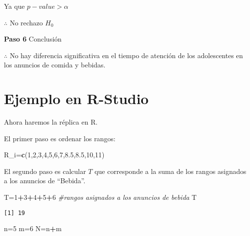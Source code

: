 \documentclass[
  a4paper,
  oneside,
  openany]{book}
\newenvironment{Shaded}{\begin{snugshade}}{\end{snugshade}}
\newcommand{\CommentTok}[1]{\textcolor[rgb]{0.56,0.35,0.01}{\textit{#1}}}
\newcommand{\DecValTok}[1]{\textcolor[rgb]{0.00,0.00,0.81}{#1}}
\newcommand{\FloatTok}[1]{\textcolor[rgb]{0.00,0.00,0.81}{#1}}
\newcommand{\KeywordTok}[1]{\textcolor[rgb]{0.13,0.29,0.53}{\textbf{#1}}}
\newcommand{\NormalTok}[1]{#1}
\newcommand{\OperatorTok}[1]{\textcolor[rgb]{0.81,0.36,0.00}{\textbf{#1}}}
\begin{document}
Ya que \(p-value > \alpha\)

\(\therefore\) No rechazo \(H_0\)

\textbf{Paso 6} Conclusión

\(\therefore\) No hay diferencia significativa en el tiempo de atención de los adolescentes en los anuncios de comida y bebidas.

\hypertarget{ejemplo-en-r-studio-5}{%
\section{Ejemplo en R-Studio}\label{ejemplo-en-r-studio-5}}

Ahora haremos la réplica en R.

El primer paso es ordenar los rangos:

\begin{Shaded}
\begin{Highlighting}[]
\NormalTok{R\_i=}\KeywordTok{c}\NormalTok{(}\DecValTok{1}\NormalTok{,}\DecValTok{2}\NormalTok{,}\DecValTok{3}\NormalTok{,}\DecValTok{4}\NormalTok{,}\DecValTok{5}\NormalTok{,}\DecValTok{6}\NormalTok{,}\DecValTok{7}\NormalTok{,}\FloatTok{8.5}\NormalTok{,}\FloatTok{8.5}\NormalTok{,}\DecValTok{10}\NormalTok{,}\DecValTok{11}\NormalTok{)}
\end{Highlighting}
\end{Shaded}

El segundo paso es calcular \(T\) que corresponde a la suma de los rangos asignados a los anuncios de ``Bebida''.

\begin{Shaded}
\begin{Highlighting}[]
\NormalTok{T=}\DecValTok{1}\OperatorTok{+}\DecValTok{3}\OperatorTok{+}\DecValTok{4}\OperatorTok{+}\DecValTok{5}\OperatorTok{+}\DecValTok{6}  \CommentTok{\#rangos asignados a los anuncios de bebida}
\NormalTok{T}
\end{Highlighting}
\end{Shaded}

\begin{verbatim}
[1] 19
\end{verbatim}

\begin{Shaded}
\begin{Highlighting}[]
\NormalTok{n=}\DecValTok{5}
\NormalTok{m=}\DecValTok{6}
\NormalTok{N=n}\OperatorTok{+}\NormalTok{m}
\end{Highlighting}
\end{Shaded}
\end{document}
